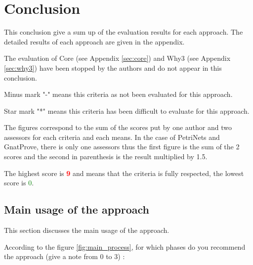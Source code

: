 

\chapter{Conclusion}
\label{sec:concl}



\begin{comment}
MPD : Todo

The sequel is let as an example is this early version.

Criteria to discuss here are those which concerns all the secondary tools as open-source issues, compatibility with primary tool-chain, compatibility with eclipse,...
\end{comment}



This conclusion give a sum up of the evaluation results for each approach. The detailed results of each approach are given in the appendix.

The evaluation of Core (see Appendix \ref{sec:core}) and Why3 (see Appendix \ref{sec:why3}) have been stopped by the authors and do not appear in this conclusion.

Minus mark "-" means this criteria as not been evaluated for this approach.

Star mark "*" means this criteria has been difficult to evaluate for this approach.

The figures correspond to the sum of the scores put by one author and two assessors for each criteria and each means.
In the case of PetriNets and GnatProve, there is only one assessors thus the first figure is the sum of the 2 scores and the second in parenthesis is the result multiplied by 1.5.

The highest score is \textcolor{red}{\textbf{9}} and means that the criteria is fully respected, the lowest score is \textcolor{green}{0}.

\section{Main usage of the approach}
\label{main_usage}
This section discusses the main usage of the approach.

According to the figure \ref{fig:main_process}, for which phases do you recommend the approach (give a note from 0 to  3) :

